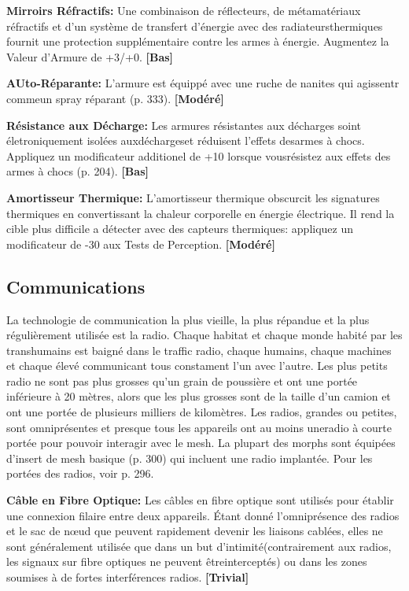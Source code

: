 \textbf{Mirroirs Réfractifs:} Une combinaison de réflecteurs, de métamatériaux réfractifs et d'un système de transfert d'énergie avec des radiateursthermiques fournit une protection supplémentaire contre les armes à énergie. Augmentez la Valeur d'Armure de +3/+0. \textbf{[Bas]} 

\textbf{AUto-Réparante:} L'armure est équippé avec une ruche de nanites qui agissentr commeun spray réparant (p. 333). \textbf{[Modéré]} 

\textbf{Résistance aux Décharge:} Les armures résistantes aux décharges soint életroniquement isolées auxdéchargeset réduisent l'effets desarmes à chocs. Appliquez un modificateur additionel de +10 lorsque vousrésistez aux effets des armes à chocs (p. 204). \textbf{[Bas]} 

\textbf{Amortisseur Thermique:} L'amortisseur thermique obscurcit les signatures thermiques en convertissant la chaleur corporelle en énergie électrique. Il rend la cible plus difficile a détecter avec des capteurs thermiques: appliquez un modificateur de -30 aux Tests de Perception. \textbf{[Modéré]} 

\subsection{Communications} \label{sec:communications} 

La technologie de communication la plus vieille, la plus répandue et la plus régulièrement utilisée est la radio. Chaque habitat et chaque monde habité par les transhumains est baigné dans le traffic radio, chaque humains, chaque machines et chaque élevé communicant tous constament l'un avec l'autre. Les plus petits radio ne sont pas plus grosses qu'un grain de poussière et ont une portée inférieure à 20 mètres, alors que les plus grosses sont de la taille d'un camion et ont une portée de plusieurs milliers de kilomètres. Les radios, grandes ou petites, sont omniprésentes et presque tous les appareils ont au moins uneradio à courte portée pour pouvoir interagir avec le mesh. La plupart des morphs sont équipées d'insert de mesh basique (p. 300) qui incluent une radio implantée. Pour les portées des radios, voir p. 296. 

\textbf{Câble en Fibre Optique:} Les câbles en fibre optique sont utilisés pour établir une connexion filaire entre deux appareils. Étant donné l'omniprésence des radios et le sac de nœud que peuvent rapidement devenir les liaisons cablées, elles ne sont généralement utilisée que dans un but d'intimité(contrairement aux radios, les signaux sur fibre optiques ne peuvent êtreinterceptés) ou dans les zones soumises à de fortes interférences radios. \textbf{[Trivial]} 

